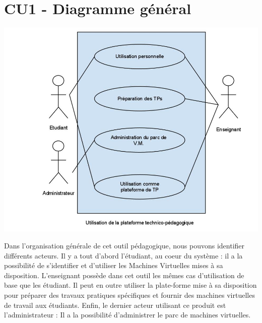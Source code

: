 \section{CU1 - Diagramme général}

\includegraphics[scale=0.4]{CU1.jpg}

Dans l’organisation générale de cet outil pédagogique, nous pouvons identifier différents acteurs. Il y a tout d’abord l’étudiant, au coeur du système : il a la possibilité de s’identifier et d’utiliser les Machines Virtuelles mises à sa disposition. L’enseignant possède dans cet outil les mêmes cas d’utilisation de base que les étudiant. Il peut en outre utiliser la plate-forme mise à sa disposition pour préparer des travaux pratiques spécifiques et fournir des machines virtuelles de travail aux étudiants. Enfin, le dernier acteur utilisant ce produit est l’administrateur : Il a la possibilité d’administrer le parc de machines virtuelles.
